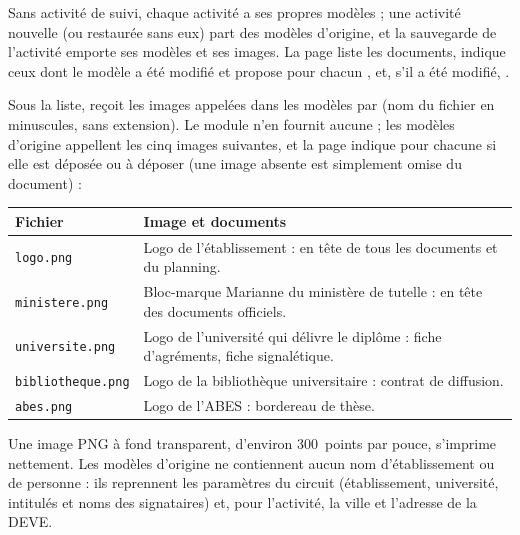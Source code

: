 \documentclass[11pt,a4paper]{article}
\begin{document}
Sans activité de suivi, chaque activité a ses propres modèles ; une activité
nouvelle (ou restaurée sans eux) part des modèles d'origine, et la sauvegarde de
l'activité emporte ses modèles et ses images. La page liste les documents,
indique ceux dont le modèle a été modifié et propose pour chacun
,  et, s'il a été modifié,
.

Sous la liste,  reçoit les images appelées dans les
modèles par  (nom du fichier en minuscules, sans extension). Le
module n'en fournit aucune ; les modèles d'origine appellent les cinq images
suivantes, et la page indique pour chacune si elle est déposée ou à déposer
(une image absente est simplement omise du document) :

\begin{center}
\small
\begin{tabularx}{\linewidth}{@{}l X@{}}
\toprule
\textbf{Fichier} & \textbf{Image et documents} \\
\midrule
\texttt{logo.png} & Logo de l'établissement : en tête de tous les documents et du planning. \\
\texttt{ministere.png} & Bloc-marque Marianne du ministère de tutelle : en tête des documents officiels. \\
\texttt{universite.png} & Logo de l'université qui délivre le diplôme : fiche d'agréments, fiche signalétique. \\
\texttt{bibliotheque.png} & Logo de la bibliothèque universitaire : contrat de diffusion. \\
\texttt{abes.png} & Logo de l'ABES : bordereau de thèse. \\
\bottomrule
\end{tabularx}
\end{center}

Une image PNG à fond transparent, d'environ 300~points par pouce, s'imprime
nettement. Les modèles d'origine ne contiennent aucun nom d'établissement ou de
personne : ils reprennent les paramètres du circuit (établissement,
université, intitulés et noms des signataires) et, pour l'activité, la ville et
l'adresse de la DEVE.

\end{document}
